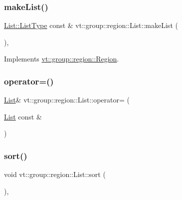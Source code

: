 \subsubsection{\texorpdfstring{make\+List()}{makeList()}}
{\footnotesize\ttfamily \hyperlink{structvt_1_1group_1_1region_1_1_region_a4e35b2fc6dca06aca0b7bc0e19b35c5a}{List\+::\+List\+Type} const  \& vt\+::group\+::region\+::\+List\+::make\+List (\begin{DoxyParamCaption}{ }\end{DoxyParamCaption})\hspace{0.3cm}{\ttfamily [override]}, {\ttfamily [virtual]}}



Implements \hyperlink{structvt_1_1group_1_1region_1_1_region_ac85c027b3c402c712c888aefc198c6be}{vt\+::group\+::region\+::\+Region}.

\mbox{\label{structvt_1_1group_1_1region_1_1_list_a60aabaef773693847cb82501bfe8d0ad}} 
\subsubsection{\texorpdfstring{operator=()}{operator=()}}
{\footnotesize\ttfamily \hyperlink{structvt_1_1group_1_1region_1_1_list}{List}\& vt\+::group\+::region\+::\+List\+::operator= (\begin{DoxyParamCaption}\item[{\hyperlink{structvt_1_1group_1_1region_1_1_list}{List} const \&}]{ }\end{DoxyParamCaption})\hspace{0.3cm}{\ttfamily [default]}}

\mbox{\label{structvt_1_1group_1_1region_1_1_list_acebca171776662bdf481ed1eb7ee4c09}} 
\subsubsection{\texorpdfstring{sort()}{sort()}}
{\footnotesize\ttfamily void vt\+::group\+::region\+::\+List\+::sort (\begin{DoxyParamCaption}{ }\end{DoxyParamCaption})\hspace{0.3cm}{\ttfamily [override]}, {\ttfamily [virtual]}}



